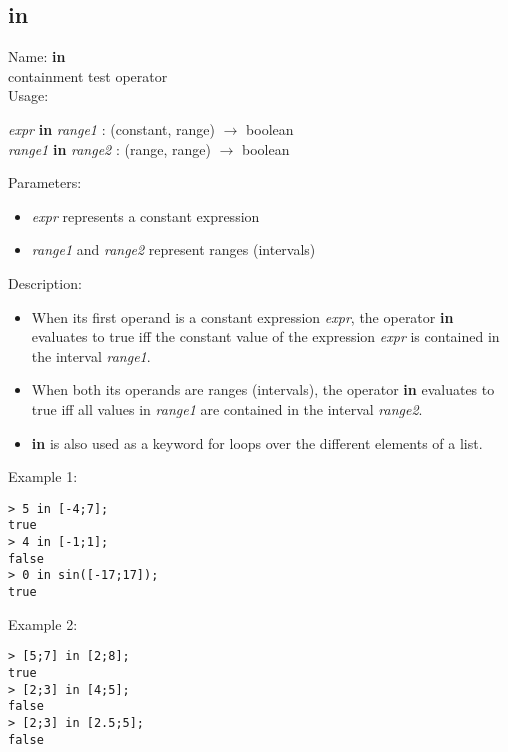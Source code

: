 \subsection{in}
\label{labin}
\noindent Name: \textbf{in}\\
containment test operator\\
\noindent Usage: 
\begin{center}
\emph{expr} \textbf{in} \emph{range1} : (\textsf{constant}, \textsf{range}) $\rightarrow$ \textsf{boolean}\\
\emph{range1} \textbf{in} \emph{range2} : (\textsf{range}, \textsf{range}) $\rightarrow$ \textsf{boolean}\\
\end{center}
Parameters: 
\begin{itemize}
\item \emph{expr} represents a constant expression
\item \emph{range1} and \emph{range2} represent ranges (intervals)
\end{itemize}
\noindent Description: \begin{itemize}

\item When its first operand is a constant expression \emph{expr},
   the operator \textbf{in} evaluates to true iff the constant value
   of the expression \emph{expr} is contained in the interval \emph{range1}.

\item When both its operands are ranges (intervals), 
   the operator \textbf{in} evaluates to true iff all values
   in \emph{range1} are contained in the interval \emph{range2}.

\item \textbf{in} is also used as a keyword for loops over the different
   elements of a list.
\end{itemize}
\noindent Example 1: 
\begin{center}\begin{minipage}{15cm}\begin{Verbatim}[frame=single]
> 5 in [-4;7];
true
> 4 in [-1;1];
false
> 0 in sin([-17;17]);
true
\end{Verbatim}
\end{minipage}\end{center}
\noindent Example 2: 
\begin{center}\begin{minipage}{15cm}\begin{Verbatim}[frame=single]
> [5;7] in [2;8];
true
> [2;3] in [4;5];
false
> [2;3] in [2.5;5];
false
\end{Verbatim}
\end{minipage}\end{center}
